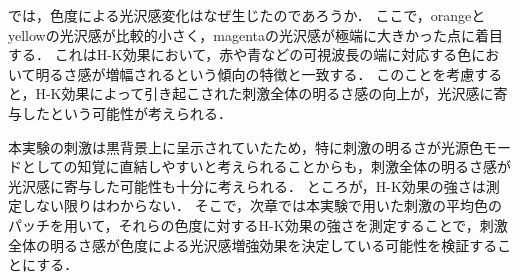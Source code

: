         では，色度による光沢感変化はなぜ生じたのであろうか．
        ここで，orangeとyellowの光沢感が比較的小さく，magentaの光沢感が極端に大きかった点に着目する．
        これはH-K効果において，赤や青などの可視波長の端に対応する色において明るさ感が増幅されるという傾向\cite{HKeffect}の特徴と一致する．
        このことを考慮すると，H-K効果によって引き起こされた刺激全体の明るさ感の向上が，光沢感に寄与したという可能性が考えられる．

        本実験の刺激は黒背景上に呈示されていたため，特に刺激の明るさが光源色モード\cite{LightMode}としての知覚に直結しやすいと考えられることからも，刺激全体の明るさ感が光沢感に寄与した可能性も十分に考えられる．
        ところが，H-K効果の強さは測定しない限りはわからない．
        そこで，次章では本実験で用いた刺激の平均色のパッチを用いて，それらの色度に対するH-K効果の強さを測定することで，刺激全体の明るさ感が色度による光沢感増強効果を決定している可能性を検証することにする．

    \newpage